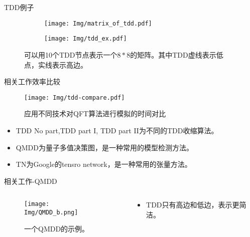 \documentclass[aspectratio=1610]{ctexbeamer}
\begin{document}
\begin{frame}{TDD例子}
    \begin{figure}
        \begin{subfigure}{0.4\textwidth}
            \texttt{[image: Img/matrix\_of\_tdd.pdf]}
            \label{fig:mat_P}
        \end{subfigure}
        \qquad
        \qquad
        \qquad
        \begin{subfigure}[c]{0.4\textwidth}
            \centering
            \texttt{[image: Img/tdd\_ex.pdf]}
            \label{fig:tdd_P}
        \end{subfigure}
        \label{fig:P}
        \caption{可以用10个TDD节点表示一个$8*8$的矩阵。其中TDD虚线表示低点，实线表示高边。}
    \end{figure}
\end{frame}
\begin{frame}{相关工作效率比较}
    \begin{figure}
        \texttt{[image: Img/tdd-compare.pdf]}
        \caption{应用不同技术对QFT算法进行模拟的时间对比}
    \end{figure}
    \begin{center}
        \begin{itemize}
        
            \item TDD No part,TDD part I, TDD part II为不同的TDD收缩算法。 
            \item QMDD为量子多值决策图，是一种常用的模型检测方法。
            \item TN为Google的tensro network，是一种常用的张量方法。
        \end{itemize}
    \end{center}
\end{frame}
\begin{frame}{相关工作-QMDD}
    \begin{columns}[C] %

        \begin{column}{.6\textwidth}
            \begin{figure}
                \texttt{[image: Img/QMDD\_b.png]}
                \caption{一个QMDD的示例。}
            \end{figure}
        \end{column}
        \begin{column}{.4\textwidth}
            \hspace{80pt}
            \begin{itemize}
                \item TDD只有高边和低边，表示更简洁。
            \end{itemize}
        \end{column}
        
    \end{columns}
  \end{frame}
\end{document}
